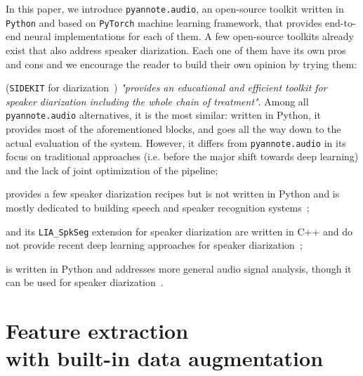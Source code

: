 \documentclass{article}
\begin{document}
In this paper, we introduce {\small \texttt{pyannote.audio}}, an open-source toolkit written in {\small \texttt{Python}} and based on {\small \texttt{PyTorch}} machine learning framework, that provides end-to-end neural implementations for each of them.
A few open-source toolkits already exist that also address speaker diarization. Each one of them have its own pros and cons and we encourage the reader to build their own opinion by trying them:
\begin{description}
\vspace{-0.17cm}
\item[{\small \texttt{S4D}}] ({\small \texttt{SIDEKIT}} for diarization~\cite{S4D}) \emph{"provides an educational and efficient toolkit for speaker diarization including the whole chain of treatment"}. Among all {\small \texttt{pyannote.audio}} alternatives, it is the most similar: written in Python, it provides most of the aforementioned blocks, and goes all the way down to the actual evaluation of the system. However, it differs from {\small \texttt{pyannote.audio}} in its focus on traditional approaches (i.e. before the major shift towards deep learning) and the lack of joint optimization of the pipeline;
\vspace{-0.17cm}
\item[{\small \texttt{Kaldi}}] provides a few speaker diarization recipes but is not written in Python and is mostly dedicated to building speech and speaker recognition systems~\cite{kaldi};
\vspace{-0.17cm}
\item[{\small \texttt{ALIZ\'{E}}}] and its {\small \texttt{LIA\_SpkSeg}} extension for speaker diarization are written in C++ and do not provide recent deep learning approaches for speaker diarization~\cite{alize};
\vspace{-0.17cm}
\item[{\small \texttt{pyAudioAnalysis}}] is written in Python and addresses more general audio signal analysis, though it can be used for speaker diarization~\cite{pyAudioAnalysis}.
\end{description}

\vspace{-0.17cm}
\section{Feature extraction \\with built-in data augmentation}
\label{sec:feature_extraction}
\end{document}
